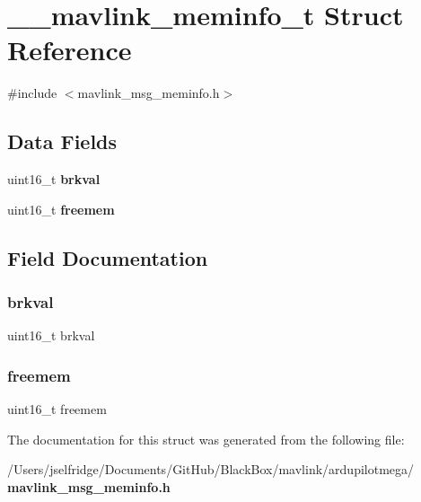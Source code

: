 \section{\+\_\+\+\_\+mavlink\+\_\+meminfo\+\_\+t Struct Reference}
\label{struct____mavlink__meminfo__t}


{\ttfamily \#include $<$mavlink\+\_\+msg\+\_\+meminfo.\+h$>$}

\subsection*{Data Fields}
\begin{DoxyCompactItemize}
\item 
uint16\+\_\+t \textbf{ brkval}
\item 
uint16\+\_\+t \textbf{ freemem}
\end{DoxyCompactItemize}


\subsection{Field Documentation}
\mbox{\label{struct____mavlink__meminfo__t_a646ea5077d385c4f568d0a292087079e}} 
\subsubsection{brkval}
{\footnotesize\ttfamily uint16\+\_\+t brkval}

\mbox{\label{struct____mavlink__meminfo__t_a812f8883688862a58146ae3373e1b48b}} 
\subsubsection{freemem}
{\footnotesize\ttfamily uint16\+\_\+t freemem}



The documentation for this struct was generated from the following file\+:\begin{DoxyCompactItemize}
\item 
/\+Users/jselfridge/\+Documents/\+Git\+Hub/\+Black\+Box/mavlink/ardupilotmega/\textbf{ mavlink\+\_\+msg\+\_\+meminfo.\+h}\end{DoxyCompactItemize}
